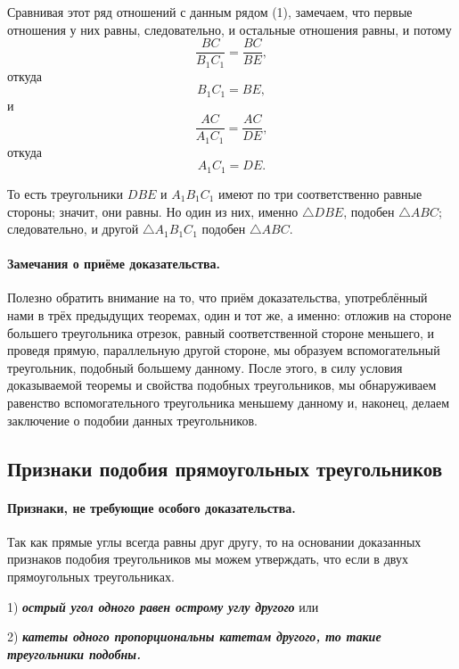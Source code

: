 \documentclass[twoside]{book}
\begin{document}
Сравнивая этот ряд отношений с данным рядом (1), замечаем, что первые отношения у них равны, следовательно, и остальные отношения равны, и потому
\[\frac{BC}{B_1C_1}=\frac{BC}{BE},\]
откуда
\[B_1C_1=BE,\]
и
\[\frac{AC}{A_1C_1}=\frac{AC}{DE},\]
откуда
\[A_1C_1=DE.\]

То есть треугольники $DBE$ и $A_1B_1C_1$ имеют по три соответственно равные стороны;
значит, они равны.
Но один из них, именно $\triangle DBE$, подобен $\triangle ABC$;
следовательно, и другой $\triangle A_1B_1C_1$ подобен $\triangle ABC$.

\paragraph{Замечания о приёме доказательства.}\label{1938/162}
Полезно обратить внимание на то, что приём доказательства, употреблённый нами в трёх предыдущих теоремах, один и тот же, а именно:
отложив на стороне большего треугольника отрезок, равный соответственной стороне меньшего, и проведя прямую, параллельную другой стороне, мы образуем вспомогательный треугольник, подобный большему данному.
После этого, в силу условия доказываемой теоремы и свойства подобных треугольников, мы обнаруживаем равенство вспомогательного треугольника меньшему данному и, наконец, делаем заключение о подобии данных треугольников.

\renewcommand{\bottomtitlespace}{.15\textheight}%

\subsection*{Признаки подобия прямоугольных треугольников}

\renewcommand{\bottomtitlespace}{.1\textheight}%

\paragraph{Признаки, не требующие особого доказательства.}\label{1938/163}
Так как прямые углы всегда равны друг другу, то на основании доказанных признаков подобия треугольников мы можем утверждать, что если в двух прямоугольных треугольниках.

1) \textbf{\emph{острый угол одного равен острому углу другого}} или

2) \textbf{\emph{катеты одного пропорциональны катетам другого, то такие треугольники подобны.}}
\end{document}
